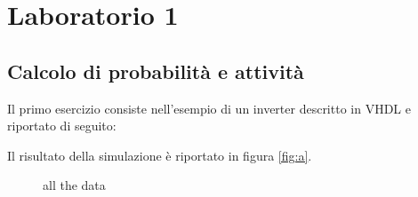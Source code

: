 

\chapter{Laboratorio 1}




\section{Calcolo di probabilit\`a e attivit\`a}

Il primo esercizio consiste nell'esempio di un inverter descritto
in VHDL e riportato di seguito:

	\begin{listato}
	
	\end{listato}


Il risultato della simulazione \`e riportato in figura \ref{fig:a}.


\begin{figure}[htp] 
    \centering
    \hfill%
    \caption{all the data}
\end{figure}

